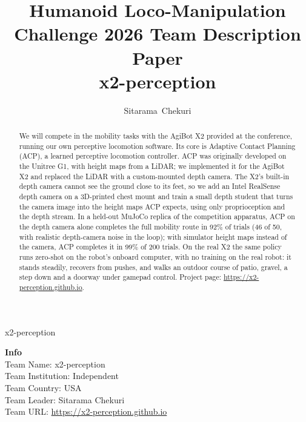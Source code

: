 \documentclass[journal]{IEEEtran}
\begin{document}
\title{Humanoid Loco-Manipulation Challenge 2026 Team Description Paper \\
 x2-perception}

\author{Sitarama~Chekuri}

%
{x2-perception}

\maketitle

\begin{flushleft}
\textbf{Info}\\
\hspace{10pt} Team Name: \hfill x2-perception\\
\hspace{10pt} Team Institution: \hfill Independent\\
\hspace{10pt} Team Country: \hfill USA\\
\hspace{10pt} Team Leader: \hfill Sitarama Chekuri\\
\hspace{10pt} Team URL: \hfill \url{https://x2-perception.github.io}
\end{flushleft}

\begin{abstract}
We will compete in the mobility tasks with the AgiBot X2 provided at the conference, running our own perceptive locomotion
software. Its core is Adaptive Contact Planning (ACP), a learned perceptive locomotion controller. ACP was originally developed on the Unitree G1, with height maps from a
LiDAR; we implemented it for the AgiBot X2 and replaced the LiDAR with a custom-mounted depth camera. The X2's built-in depth
camera cannot see the ground close to its feet, so we add an Intel RealSense depth camera on a 3D-printed chest mount and train a small depth student
that turns the camera image into the height maps ACP expects, using only proprioception and the depth stream. In a held-out MuJoCo replica of the competition
apparatus, ACP on the depth camera alone completes the full mobility route in 92\% of trials (46 of 50, with realistic
depth-camera noise in the loop); with simulator height maps instead of the camera, ACP completes it in 99\% of 200 trials. On the
real X2 the same policy runs zero-shot on the robot's onboard computer, with no training on the real robot: it stands steadily,
recovers from pushes, and walks an outdoor course of patio, gravel, a step down and a doorway under gamepad control. Project page:
\url{https://x2-perception.github.io}.
\end{abstract}
\end{document}
